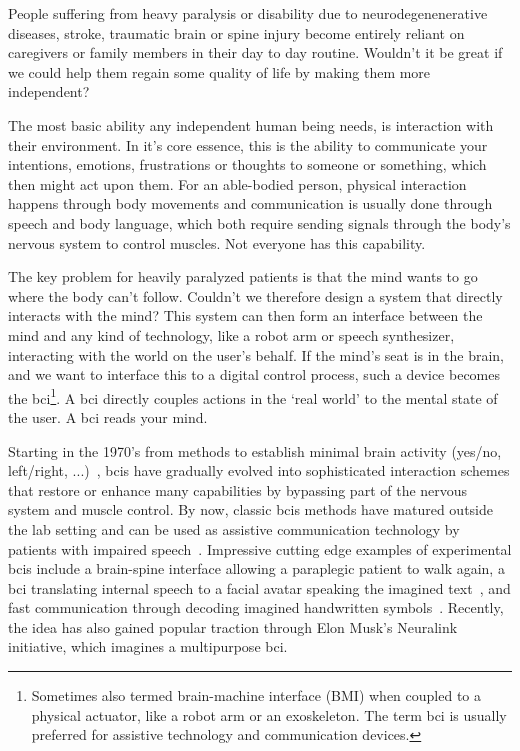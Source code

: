 People suffering from heavy paralysis or disability due to
neurodegenenerative diseases, stroke, traumatic brain or spine injury
become entirely reliant on caregivers or family members in their day to day
routine.
Wouldn't it be great if we could help them regain some quality of life by
making them more independent?

The most basic ability any independent human being needs, is interaction with
their environment.
In it's core essence, this is the ability to communicate your intentions,
emotions, frustrations or thoughts to someone or something, which then might
act upon them.
For an able-bodied person, physical interaction happens through body movements
and communication is usually done through speech and body language, which
both require sending signals through the body's nervous system to control
muscles.
Not everyone has this capability.

The key problem for heavily paralyzed patients is that the mind wants to go
where the body can't follow.
Couldn't we therefore design a system that directly interacts with the mind?
This system can then form an interface between the mind and any kind of
technology, like a robot arm or speech synthesizer, interacting with the world
on the user's behalf.
If the mind's seat is in the brain, and we want to interface this to a digital
control process, such a device becomes the \ac{bci}\footnote{Sometimes also
termed brain-machine interface (BMI) when coupled to a physical actuator, like
a robot arm or an exoskeleton. The term \ac{bci} is usually preferred for
assistive technology and communication devices.}.
A \ac{bci} directly couples actions in the `real world' to the mental state of
the user.
A \ac{bci} reads your mind.

Starting in the 1970's from methods to establish minimal brain activity
(yes/no, left/right, ...)~\cite{Wolpaw2002}, \acp{bci} have gradually evolved
into sophisticated interaction schemes that restore or enhance many capabilities
by bypassing part of the nervous system and muscle control.
By now, classic \acp{bci} methods have matured outside the lab setting and can be
used as assistive communication technology by patients with impaired
speech~\cite{Wolpaw2018}.
Impressive cutting edge examples of experimental \acp{bci} include a brain-spine
interface allowing a paraplegic patient to walk again\cite{Lorach2023},
a \ac{bci} translating internal speech to a facial avatar speaking the imagined
text~\cite{Metzger2023}, and fast communication through decoding imagined
handwritten symbols~\cite{Willett2021}.
Recently, the idea has also gained popular traction through Elon Musk's
Neuralink~\cite{Musk2019} initiative, which imagines a multipurpose \ac{bci}.

